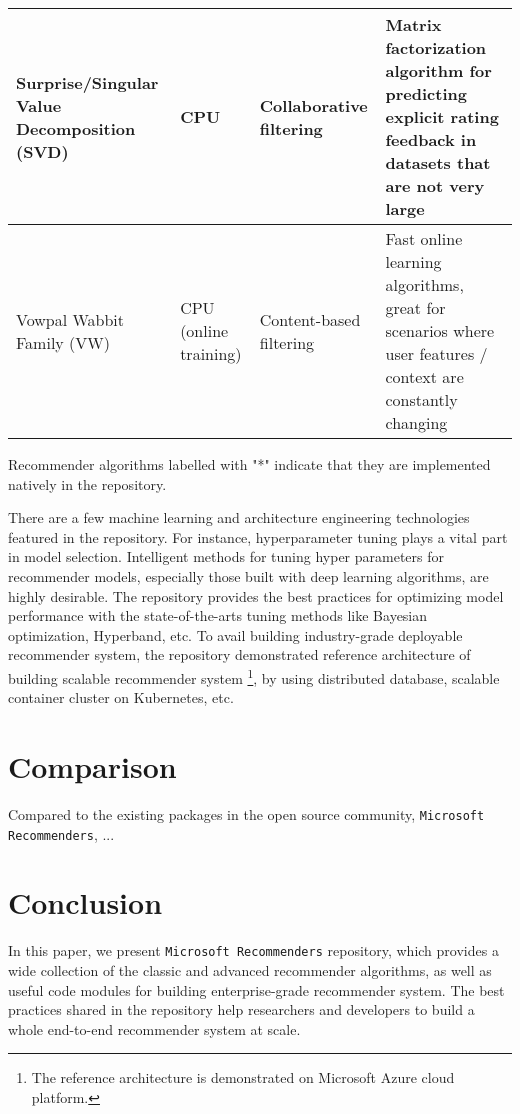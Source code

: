 \documentclass[twoside,11pt]{article}
\begin{document}
\begin{adjustbox}{angle=90}
\begin{threeparttable}
\begin{tabular}{|p{5cm}|p{2cm}|p{2cm}|p{6cm}|}
    \hline
    Surprise/Singular Value Decomposition (SVD) & CPU & Collaborative filtering & Matrix factorization algorithm for predicting explicit rating feedback in datasets that are not very large \\
    \hline
    Vowpal Wabbit Family (VW) & CPU (online training) & Content-based filtering & Fast online learning algorithms, great for scenarios where user features / context are constantly changing \\
    \hline
    \end{tabular}
    \begin{tablenotes}
      \scriptsize
      \item Recommender algorithms labelled with "*" indicate that they are implemented natively in the repository.
    \end{tablenotes}
  \end{threeparttable}
\end{adjustbox}

There are a few machine learning and architecture engineering technologies featured in the repository. For instance, hyperparameter tuning plays a vital part in model selection. Intelligent methods for tuning hyper parameters for recommender models, especially those built with deep learning algorithms, are highly desirable. The repository provides the best practices for optimizing model performance with the state-of-the-arts tuning methods like Bayesian optimization, Hyperband, etc. \citep{pelikan1999boa,li2016hyperband} To avail building industry-grade deployable recommender system, the repository demonstrated reference architecture of building scalable recommender system \footnote{The reference architecture is demonstrated on Microsoft Azure cloud platform.}, by using distributed database, scalable container cluster on Kubernetes, etc.

\section{Comparison}
Compared to the existing packages in the open source community, \verb|Microsoft Recommenders|, ...  

\section{Conclusion}
In this paper, we present \verb|Microsoft Recommenders| repository, which provides a wide collection of the classic and advanced recommender algorithms, as well as useful code modules for building enterprise-grade recommender system. The best practices shared in the repository help researchers and developers to build a whole end-to-end recommender system at scale.
\end{document}
